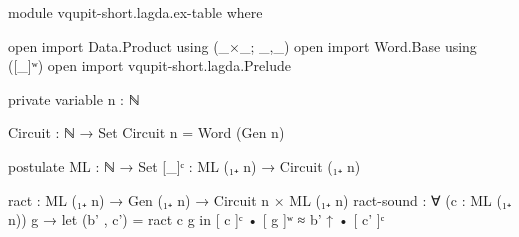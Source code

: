 \begin{code}[hide]
module vqupit-short.lagda.ex-table where

open import Data.Product using (_×_; _,_)
open import Word.Base using ([_]ʷ)
open import vqupit-short.lagda.Prelude

private variable
  n : ℕ

Circuit : ℕ → Set
Circuit n = Word (Gen n)

postulate
  ML : ℕ → Set
  [_]ᶜ : ML (₁₊ n) → Circuit (₁₊ n)
\end{code}
\begin{code}
  ract        : ML (₁₊ n) → Gen (₁₊ n) → Circuit n × ML (₁₊ n)
  ract-sound  : ∀ (c : ML (₁₊ n)) g → let (b' , c') = ract c g in [ c ]ᶜ • [ g ]ʷ ≈ b' ↑ • [ c' ]ᶜ
\end{code}
